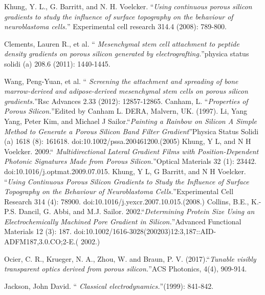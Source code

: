 \documentclass{article}
\begin{document}
\begin{thebibliography}{X}
 Khung, Y. L., G. Barritt, and
  N. H. Voelcker. \textquotedblleft \emph{Using continuous porous
    silicon gradients to study the influence of surface topography
    on the behaviour of neuroblastoma cells.}\textquotedblright
  Experimental cell research 314.4 (2008): 789-800.

 Clements, Lauren R., et al. \textquotedblleft
  \emph{Mesenchymal stem cell attachment to peptide density
    gradients on porous silicon generated by
    electrografting.}\textquotedblright physica status solidi (a)
  208.6 (2011): 1440-1445.

 Wang, Peng-Yuan, et al. \textquotedblleft
  \emph{Screening the attachment and spreading of bone
    marrow-derived and adipose-derived mesenchymal stem cells on
    porous silicon gradients.}\textquotedblright Rsc Advances 2.33
  (2012): 12857-12865.
 Canham, L. \textquotedblleft \emph{Properties of
    Porous Silicon.}\textquotedblright Edited by Canham L. DERA,
  Malvern, UK. (1997).
 Li, Yang Yang, Peter Kim, and Michael J
  Sailor.\textquotedblleft \emph{Painting a Rainbow on Silicon A
    Simple Method to Generate a Porous Silicon Band Filter
    Gradient}\textquotedblright Physica Status Solidi (a) 1618 (8):
  161618. doi:10.1002/pssa.200461200.(2005)
 Khung, Y L, and N H
  Voelcker. 2009.\textquotedblleft\emph{ Multidirectional Lateral
    Gradient Films with Position-Dependent Photonic Signatures Made
    from Porous Silicon.}\textquotedblright Optical Materials 32
  (1): 23442. doi:10.1016/j.optmat.2009.07.015.
  Khung, Y L, G Barritt, and N H Voelcker.
  \textquotedblleft \emph{Using Continuous Porous Silicon Gradients
    to Study the Influence of Surface Topography on the Behaviour of
    Neuroblastoma Cells.}\textquotedblright Experimental Cell
  Research 314 (4): 78900. doi:10.1016/j.yexcr.2007.10.015.(2008.)
 Collins, B.E., K.-P.S. Dancil, G. Abbi, and
  M.J. Sailor. 2002.\textquotedblleft \emph{Determining Protein Size
    Using an Electrochemically Machined Pore Gradient in
    Silicon.}\textquotedblright Advanced Functional Materials 12 (3):
  187. doi:10.1002/1616-3028(200203)12:3,187::AID-ADFM187,3.0.CO;2-E.(
  2002.)

 Ocier, C. R., Krueger, N. A., Zhou, W. and  Braun,
  P. V. (2017).\textquotedblleft \emph{Tunable visibly transparent
    optics derived from porous silicon.}\textquotedblright ACS
  Photonics, 4(4), 909-914.


  Jackson, John David. \textquotedblleft
  \emph{Classical electrodynamics.}\textquotedblright (1999): 841-842.


\end{thebibliography}
\end{document}

